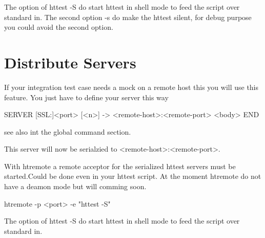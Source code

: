 The option of httest -S do start httest in shell mode to feed the script over standard in.
The second option -s do make the httest silent, for debug purpose you could avoid the second
option.

\section{Distribute Servers}
\label{chap:distributeClients}

If your integration test case needs a mock on a remote host this you will use this feature.
You just have to define your server this way

\begin{usplisting}
  SERVER [SSL:]<port> [<n>] -> <remote-host>:<remote-port>
  <body>
  END
\end{usplisting}

see also int the global command section.

This server will now be serialzied to <remote-host>:<remote-port>.

With htremote a remote acceptor for the serialized httest servers must be started.Could
be done even in your httest script. At the moment htremote do not have a deamon mode but
will comming soon.

\begin{usplisting}
  htremote -p <port> -e "httest -S"
\end{usplisting}

The option of httest -S do start httest in shell mode to feed the script over standard in.

